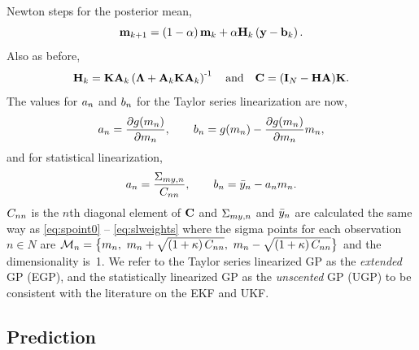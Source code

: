\documentclass{article} %
\begin{document}
Newton steps for the posterior mean,
\begin{equation}
    \mathbf{m}_{k+1} = \left({1-\alpha}\right)\mathbf{m}_k 
        + \alpha\mathbf{H}_k\left({\mathbf{y} - \mathbf{b}_k}\right).
\end{equation}
Also as before,
\begin{equation}
    \mathbf{H}_k = \mathbf{K}\mathbf{A}_k\left({\boldsymbol\Lambda + \mathbf{A}_k\mathbf{K}\mathbf{A}_k}\right)^{\text{-}1}
    \quad \text{and} \quad
    \mathbf{C} = \left({\mathbf{I}_{N} - \mathbf{H}\mathbf{A}}\right)\!\mathbf{K}.
\end{equation}
The values for $a_n$ and $b_n$ for the Taylor series linearization
are now,
\begin{equation}
    a_n = \frac{\partial g\!\left({{m_n}}\right)}{\partial m_n},
    \qquad
    b_n = g\!\left({{m_n}}\right)
        - \frac{\partial g\!\left({{m_n}}\right)}{\partial m_n} m_n,
\end{equation}
and for statistical linearization,
\begin{equation}
    a_n = \frac{\Sigma_{my,n}}{C_{nn}},
    \qquad
    b_n = \bar{y}_n - a_nm_n.
\end{equation}
$C_{nn}$ is the $n$th diagonal element of $\mathbf{C}$ and
$\Sigma_{my,n}$ and $\bar{y}_n$ are calculated the same way as
\eqref{eq:spoint0} -- \eqref{eq:slweights} where the sigma points for each
observation $n \in N$ are $\mathcal{M}_{n} = \big\{m_n,~m_n +
\sqrt{\left({1 + \kappa}\right)C_{nn}},~m_n - \sqrt{\left({1 +
        \kappa}\right)C_{nn}}\big\}$ and the dimensionality is~1. We refer to
the Taylor series linearized GP as the \emph{extended} GP (EGP), and the
statistically linearized GP as the \emph{unscented} GP (UGP) to be consistent
with the literature on the EKF and UKF.

\subsection{Prediction}
\end{document}
